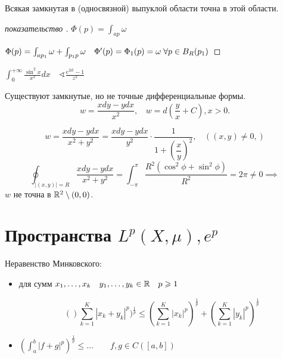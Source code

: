 \begin{theorem}
    [Пуанкаре]

    Всякая замкнутая в (односвязной) выпуклой области точна в этой области.
\end{theorem}

\begin{proof}
    [показательство ]

    $\Phi(p) = \int_{ap}\omega$

    $\Phi(p) = \int_{ap_1}\omega + \int_{p_1p}\omega\quad \Phi^{\prime}(p) = \Phi_1(p) = \omega\;\forall p\in B_R(p_1)$
\end{proof}

\begin{problem}
    $\int_0^{+\infty } \frac{\sin^2 x}{x^2}dx\quad \sphericalangle \frac{e^{2it} - 1}{z^2}$
\end{problem}

\begin{note}
    Существуют замкнутые, но не точные дифференциальные формы.
    \[ w = \dfrac{x dy - y dx}{x^2 },~~~~
    w = d\left(\dfrac{y}{x} + C\right), x > 0.\]

    \[w = \dfrac{x dy - y dx}{x^2 + y^2} = \dfrac{x dy - y dx}{y^2} \cdot \dfrac{1}{1 + \left(\dfrac{x}{y}\right)^2},~~~~((x, y)\neq 0, )\]
    \[ \oint_{|(x, y)| = R} \dfrac{x dy -y dx}{x^2 + y^2} = \int_{-\pi}^{\pi} \dfrac{R^2 \left(\cos^2 \phi + \sin^2 \phi \right)}{R^2} = 2\pi \neq 0 \implies\]
    $w$ не точна в $\mathbb{R}^2 \setminus(0, 0)$.

\end{note}

\section{Пространства $L^p(X, \mu), e^p$}

\begin{note}
    Неравенство Минковского:
    \begin{itemize}
        \item для сумм $x_1, \ldots, x_k\quad y_1, \ldots, y_k \in \mathbb{R}\quad p \geqslant 1$

        \[()\sum_{k=1}^{K} |x_k + y_k|^p)^{\frac{1}{p}} \leqslant \left( \sum_{k=1}^{K} |x_k|^p \right)^{\frac{1}{p}} + \left( \sum_{k=1}^{K} |y_k|^p \right)^{\frac{1}{p}} \]
        \item $\left( \int_a^b |f + g|^p \right) ^{\frac{1}{p}} \leqslant \ldots\qquad f, g\in C([a,b])$
    \end{itemize}
\end{note}


